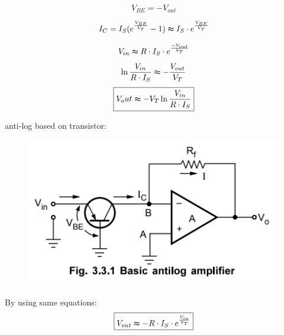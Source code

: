 \documentclass{article}
\begin{document}
\[
V_{BE}=- V_{out}
\]

\[
I_C=I_S(e^{\frac{V_{BE}}{V_T}}-1) \thickapprox I_S \cdot e^{\frac{V_{BE}}{V_T}} 
\]

\[
V_{in} \thickapprox R\cdot I_S \cdot e^{\frac{ - V_{out}}{V_T}}  
\]
\[
\ln{\frac{V_{in}}{R \cdot I_S }} \thickapprox - \frac{V_{out}}{V_T}
\]
\[
\boxed{V_out \thickapprox - V_T \ln{\frac{V_{in}}{R \cdot I_S}}}
\]

anti-log based on transistor:
\begin{figure}[h]
    \centering
    \includegraphics[width=.4\textwidth]{antiLogAmp2.jpg}
\end{figure}
By using same equations:
\[
\boxed{V_{out} \thickapprox -R \cdot I_S \cdot e^{\frac{V_{in}}{V_T}}}
\]
\end{document}
